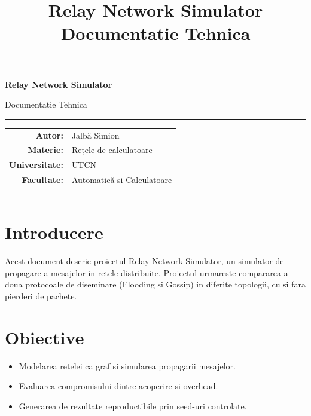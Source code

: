 \documentclass[12pt,a4paper]{article}
\title{Relay Network Simulator\\Documentatie Tehnica}
\author{}
\date{}
\begin{document}
\begin{titlepage}
  \centering
  \vspace*{1.5cm}
  {\LARGE \textbf{Relay Network Simulator}\par}
  \vspace{0.6em}
  {\Large Documentatie Tehnica\par}
  \vspace{0.8em}
  {\color{gray}\rule{0.7\textwidth}{0.6pt}}\par
  \vspace{2em}
  \begin{tabular}{rl}
    \textbf{Autor:} & Jalbă Simion \\
    \textbf{Materie:} & Rețele de calculatoare \\
    \textbf{Universitate:} & UTCN \\
    \textbf{Facultate:} & Automatică si Calculatoare \\
  \end{tabular}
  \vfill
  {\color{gray}\rule{0.5\textwidth}{0.4pt}}\par
  \vspace*{0.8cm}
\end{titlepage}

\clearpage
{}
\tableofcontents
{\small
\listoffigures
}
\clearpage
{}

\section{Introducere}
Acest document descrie proiectul Relay Network Simulator, un simulator de propagare a mesajelor in retele distribuite. Proiectul urmareste compararea a doua protocoale de diseminare (Flooding si Gossip) in diferite topologii, cu si fara pierderi de pachete.

\section{Obiective}
\begin{itemize}
  \item Modelarea retelei ca graf si simularea propagarii mesajelor.
  \item Evaluarea compromisului dintre acoperire si overhead.
  \item Generarea de rezultate reproductibile prin seed-uri controlate.
\end{itemize}
\end{document}
